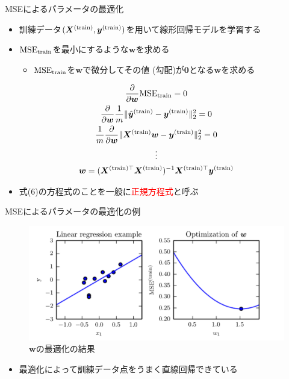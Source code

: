 \documentclass[dvipdfmx, 10pt]{beamer}
\newcommand{\green}[1]{\textcolor{green!40!black}{#1}}
\begin{document}
\begin{frame}{MSEによるパラメータの最適化}
  \begin{itemize}
    \item 訓練データ$(\bm{X}^{\rm (train)}, \bm{y}^{\rm (train)})$を用いて線形回帰モデルを学習する
    \item $\mathrm{MSE}_{\rm train}$を最小にするような$\bm{w}$を求める
    \begin{itemize}
      \item $\mathrm{MSE}_{\rm train}$を$\bm{w}$で微分してその値 (勾配)が$\bm{0}$となる$\bm{w}$を求める
    \end{itemize}
  \end{itemize}
  \begin{gather}
    \dfrac{\partial} {\partial \bm{w}} \mathrm{MSE}_{\rm train} = 0 \\
    \dfrac{\partial} {\partial \bm{w}} \dfrac{1} {m}\| \hat{\bm{y}} ^ {\rm (train)} - \bm{y} ^ {\rm (train)} \| _{2}^{2} = 0 \\
    \dfrac{1} {m} \dfrac{\partial} {\partial \bm{w}} \| \bm{X}^{\rm (train)} \bm{w} - \bm{y} ^ {\rm (train)} \| _{2}^{2} = 0 \\
    \vdots \nonumber \\ 
    \bm{w} = (\bm{X} ^ {\rm (train)\top} \bm{X} ^ {\rm (train)}) ^ {-1} \bm{X} ^ {\rm (train)\top} \bm{y} ^ {\rm (train)}
  \end{gather}
  \begin{itemize}
    \item 式(6)の方程式のことを一般に\textcolor{red}{正規方程式}と呼ぶ
  \end{itemize}
\end{frame}


\begin{frame}{MSEによるパラメータの最適化の例}
  \begin{figure}
     \includegraphics[width=0.9\linewidth]{./images/mse-opt.png}
     \caption{$\bm{w}$の最適化の結果}
  \end{figure}
  \begin{itemize}
    \item 最適化によって訓練データ点をうまく直線回帰できている
  \end{itemize}
\end{frame}
\end{document}
